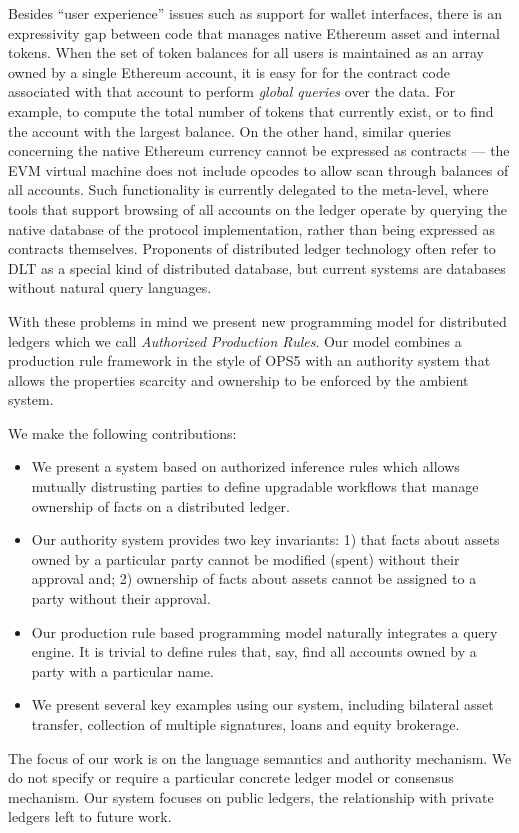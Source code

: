 Besides ``user experience'' issues such as support for wallet interfaces, there is an expressivity gap between code that manages native Ethereum asset and internal tokens. When the set of token balances for all users is maintained as an array owned by a single Ethereum account, it is easy for for the contract code associated with that account to perform \emph{global queries} over the data. For example, to compute the total number of tokens that currently exist, or to find the account with the largest balance. On the other hand, similar queries concerning the native Ethereum currency cannot be expressed as contracts --- the EVM virtual machine does not include opcodes to allow scan through balances of all accounts. Such functionality is currently delegated to the meta-level, where tools that support browsing of all accounts on the ledger operate by querying the native database of the protocol implementation, rather than being expressed as contracts themselves. Proponents of distributed ledger technology often refer to DLT as a special kind of distributed database, but current systems are databases without natural query languages.

With these problems in mind we present new programming model for distributed ledgers which we call \emph{Authorized Production Rules}. Our model combines a production rule framework in the style of OPS5 with an authority system that allows the properties scarcity and ownership to be enforced by the ambient system.

We make the following contributions:

\begin{itemize}
\item We present a system based on authorized inference rules which allows mutually distrusting parties to define upgradable workflows that manage ownership of facts on a distributed ledger.

\item Our authority system provides two key invariants: 1) that facts about assets owned by a particular party cannot be modified (spent) without their approval and; 2) ownership of facts about assets cannot be assigned to a party without their approval.

\item Our production rule based programming model naturally integrates a query engine. It is trivial to define rules that, say, find all accounts owned by a party with a particular name.

\item We present several key examples using our system, including bilateral asset transfer, collection of multiple signatures, loans and equity brokerage.
\end{itemize}

The focus of our work is on the language semantics and authority mechanism. We do not specify or require a particular concrete ledger model or consensus mechanism. Our system focuses on public ledgers, the relationship with private ledgers left to future work.

